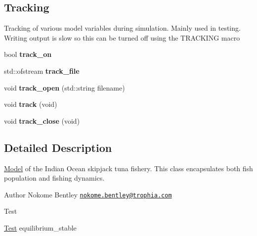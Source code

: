 \subsection*{Tracking}
\label{_amgrp2205dc082ba550b67ad71e3e2241d9a6}%
Tracking of various model variables during simulation. Mainly used in testing. Writing output is slow so this can be turned off using the T\-R\-A\-C\-K\-I\-N\-G macro \begin{DoxyCompactItemize}
\item 
\hypertarget{classIOSKJ_1_1Model_ab2c712a92a7f11ef0d8282bd97167872}{bool {\bfseries track\-\_\-on}}\label{classIOSKJ_1_1Model_ab2c712a92a7f11ef0d8282bd97167872}

\item 
\hypertarget{classIOSKJ_1_1Model_a54eea6573edc1058346964bd39413b99}{std\-::ofstream {\bfseries track\-\_\-file}}\label{classIOSKJ_1_1Model_a54eea6573edc1058346964bd39413b99}

\item 
\hypertarget{classIOSKJ_1_1Model_a886bf4ee5289a07b220cedfd2accf801}{void {\bfseries track\-\_\-open} (std\-::string filename)}\label{classIOSKJ_1_1Model_a886bf4ee5289a07b220cedfd2accf801}

\item 
\hypertarget{classIOSKJ_1_1Model_af18a3687dd2685745174b91e0aae56ce}{void {\bfseries track} (void)}\label{classIOSKJ_1_1Model_af18a3687dd2685745174b91e0aae56ce}

\item 
\hypertarget{classIOSKJ_1_1Model_a35a3793549d5fab47834483c0c013a78}{void {\bfseries track\-\_\-close} (void)}\label{classIOSKJ_1_1Model_a35a3793549d5fab47834483c0c013a78}

\end{DoxyCompactItemize}


\subsection{Detailed Description}
\hyperlink{classIOSKJ_1_1Model}{Model} of the Indian Ocean skipjack tuna fishery. This class encapsulates both fish population and fishing dynamics.

\begin{DoxyAuthor}{Author}
Nokome Bentley \href{mailto:nokome.bentley@trophia.com}{\tt nokome.\-bentley@trophia.\-com}
\end{DoxyAuthor}
\begin{DoxyRefDesc}{Test}
\item[\hyperlink{test__test000001}{Test}]equilibrium\-\_\-stable\end{DoxyRefDesc}


